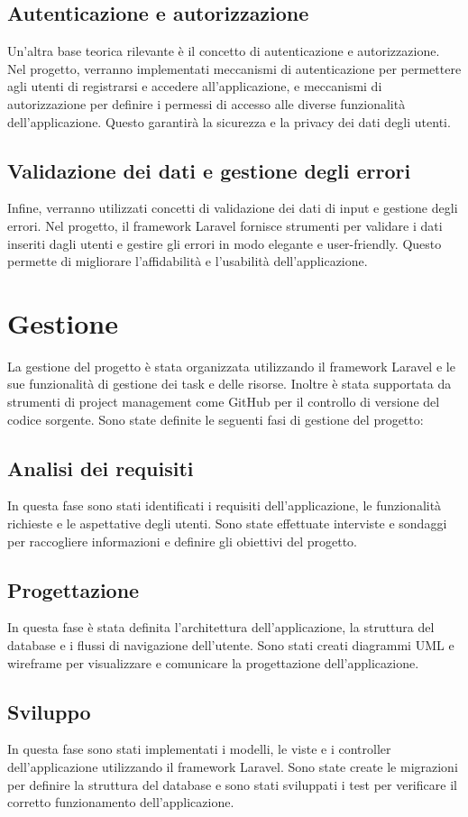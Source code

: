 \documentclass{article}
\begin{document}
\subsection{Autenticazione e autorizzazione}
Un'altra base teorica rilevante è il concetto di autenticazione e autorizzazione. Nel progetto, verranno implementati meccanismi di autenticazione per permettere agli utenti di registrarsi e accedere all'applicazione, e meccanismi di autorizzazione per definire i permessi di accesso alle diverse funzionalità dell'applicazione. Questo garantirà la sicurezza e la privacy dei dati degli utenti.

\subsection{Validazione dei dati e gestione degli errori}
Infine, verranno utilizzati concetti di validazione dei dati di input e gestione degli errori. Nel progetto, il framework Laravel fornisce strumenti per validare i dati inseriti dagli utenti e gestire gli errori in modo elegante e user-friendly. Questo permette di migliorare l'affidabilità e l'usabilità dell'applicazione.
\section{Gestione}
La gestione del progetto è stata organizzata utilizzando il framework Laravel e le sue funzionalità di gestione dei task e delle risorse. Inoltre è stata supportata da strumenti di project management come GitHub per il controllo di versione del codice sorgente. Sono state definite le seguenti fasi di gestione del progetto:
\subsection{Analisi dei requisiti}
In questa fase sono stati identificati i requisiti dell'applicazione, le funzionalità richieste e le aspettative degli utenti. Sono state effettuate interviste e sondaggi per raccogliere informazioni e definire gli obiettivi del progetto.
\subsection{Progettazione}
In questa fase è stata definita l'architettura dell'applicazione, la struttura del database e i flussi di navigazione dell'utente. Sono stati creati diagrammi UML e wireframe per visualizzare e comunicare la progettazione dell'applicazione.
\subsection{Sviluppo}
In questa fase sono stati implementati i modelli, le viste e i controller dell'applicazione utilizzando il framework Laravel. Sono state create le migrazioni per definire la struttura del database e sono stati sviluppati i test per verificare il corretto funzionamento dell'applicazione.
\end{document}
